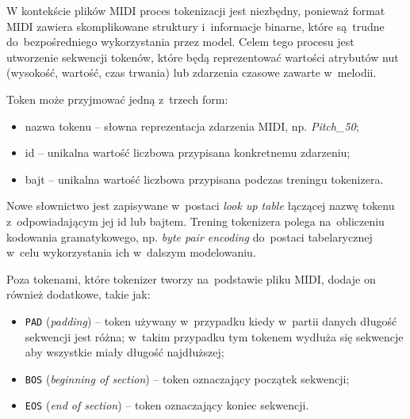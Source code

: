 \documentclass[data-science]{agh-wi} %
\begin{document}
W kontekście plików MIDI proces tokenizacji jest niezbędny, ponieważ format MIDI zawiera skomplikowane struktury i~informacje binarne, które są~trudne do~bezpośredniego wykorzystania przez model. Celem tego procesu jest utworzenie sekwencji tokenów, które będą reprezentować wartości atrybutów nut (wysokość, wartość, czas trwania) lub zdarzenia czasowe zawarte w~melodii.

Token może przyjmować jedną z~trzech form:
\begin{itemize}
    \item nazwa tokenu -- słowna reprezentacja zdarzenia MIDI, np. \textit{Pitch\_50};
    \item id -- unikalna wartość liczbowa przypisana konkretnemu zdarzeniu;
    \item bajt -- unikalna wartość liczbowa przypisana podczas treningu tokenizera.
\end{itemize}

Nowe słownictwo jest zapisywane w~postaci \textit{look up table} łączącej nazwę tokenu z~odpowiadającym jej id lub bajtem. Trening tokenizera polega na~obliczeniu kodowania gramatykowego, np. \textit{byte pair encoding} do~postaci tabelarycznej w~celu wykorzystania ich w~dalszym modelowaniu.

Poza tokenami, które tokenizer tworzy na~podstawie pliku MIDI, dodaje on również dodatkowe, takie jak:
\begin{itemize}
    \item \texttt{PAD} (\textit{padding}) -- token używany w~przypadku kiedy w~partii danych długość sekwencji jest różna; w~takim przypadku tym tokenem wydłuża się sekwencje aby wszystkie miały długość najdłuższej;
    \item \texttt{BOS} (\textit{beginning of section}) -- token oznaczający początek sekwencji;
    \item \texttt{EOS} (\textit{end of section}) -- token oznaczający koniec sekwencji.
\end{itemize}
\end{document}
